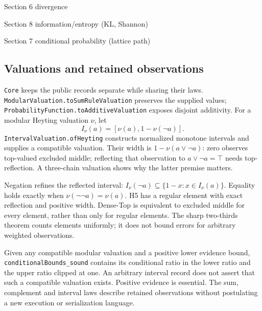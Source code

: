 \documentclass[11pt]{article}
\theoremstyle{definition}
\theoremstyle{remark}
\begin{document}
\begin{description}
\medskip
\item[\href{https://github.com/zariuq/ks-foundations-of-inference/blob/main/KnuthSkilling/Information/Divergence.lean}{\texttt{Information/Divergence.lean}}] Section 6 divergence
\item[\href{https://github.com/zariuq/ks-foundations-of-inference/blob/main/KnuthSkilling/Information/InformationEntropy.lean}{\texttt{Information/InformationEntropy.lean}}] Section 8 information/entropy (KL, Shannon)

\medskip
\item[{\footnotesize\href{https://github.com/zariuq/ks-foundations-of-inference/blob/main/KnuthSkilling/Probability/ConditionalProbability/Basic.lean}{\texttt{Probability/ConditionalProbability/Basic.lean}}}] Section 7 conditional probability (lattice path)
\end{description}

\subsection{Valuations and retained observations}
\texttt{Core} keeps the public records separate while sharing their laws.
\texttt{ModularValuation.toSumRuleValuation} preserves the supplied values;
\texttt{ProbabilityFunction.toAdditiveValuation} exposes disjoint additivity.
For a modular Heyting valuation $\nu$, let
\[
 I_\nu(a)=[\nu(a),1-\nu(\neg a)].
\]
\texttt{IntervalValuation.ofHeyting} constructs normalized monotone intervals
and supplies a compatible valuation. Their width is
$1-\nu(a\vee\neg a)$: zero observes top-valued excluded middle;
reflecting that observation to $a\vee\neg a=\top$ needs top-reflection.
A three-chain valuation shows why the latter premise matters.

Negation refines the reflected interval:
$I_\nu(\neg a)\subseteq\{1-x:x\in I_\nu(a)\}$.
Equality holds exactly when $\nu(\neg\neg a)=\nu(a)$.
H5 has a regular element with exact reflection and positive width.
Dense-Top is equivalent to excluded middle for every element, rather than only
for regular elements. The sharp two-thirds theorem counts elements uniformly;
it does not bound errors for arbitrary weighted observations.

Given any compatible modular valuation and a positive lower evidence bound,
\texttt{conditionalBounds\_sound} contains its conditional ratio in the lower
ratio and the upper ratio clipped at one. An arbitrary interval record does not
assert that such a compatible valuation exists. Positive evidence is essential.
The sum, complement and interval laws describe retained observations without
postulating a new execution or serialization language.
\end{document}
